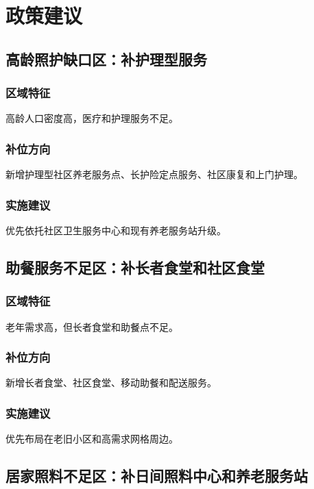 \section{政策建议}

\subsection{高龄照护缺口区：补护理型服务}

\subsubsection{区域特征}

高龄人口密度高，医疗和护理服务不足。

\subsubsection{补位方向}

新增护理型社区养老服务点、长护险定点服务、社区康复和上门护理。

\subsubsection{实施建议}

优先依托社区卫生服务中心和现有养老服务站升级。

\subsection{助餐服务不足区：补长者食堂和社区食堂}

\subsubsection{区域特征}

老年需求高，但长者食堂和助餐点不足。

\subsubsection{补位方向}

新增长者食堂、社区食堂、移动助餐和配送服务。

\subsubsection{实施建议}

优先布局在老旧小区和高需求网格周边。

\subsection{居家照料不足区：补日间照料中心和养老服务站}

